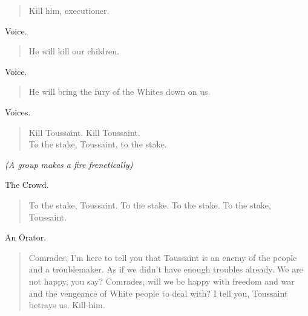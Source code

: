 \documentclass[letterpaper,article,12pt,oneside,notitlepage]{memoir}
\begin{document}
\begin{verse}
Kill him, executioner. \\
\end{verse}

\begin{center}Voice.\end{center}

\begin{verse}
He will kill our children. \\
\end{verse}

\begin{center}Voice.\end{center}

\begin{verse}
He will bring the fury of the Whites down on us. \\
\end{verse}

\clearpage

\begin{center}Voices.\end{center}

\begin{verse}
Kill Toussaint. Kill Toussaint. \\
To the stake, Toussaint, to the stake. \\
\end{verse}

 \textit{(A group makes a fire frenetically)}

\begin{center}The Crowd.\end{center}

\begin{verse}
To the stake, Toussaint. To the stake. To the stake. To the stake, Toussaint. \\
\end{verse}

\begin{center}An Orator.\end{center}

\begin{verse}
\indent Comrades, I'm here to tell you that Toussaint is an enemy of the people and a troublemaker. As if we didn't have enough troubles already. We are not happy, you say? Comrades, will we be happy with freedom and war and the vengeance of White people to deal with? I tell you, Toussaint betrays us. Kill him. \\
\end{verse}
\end{document}
